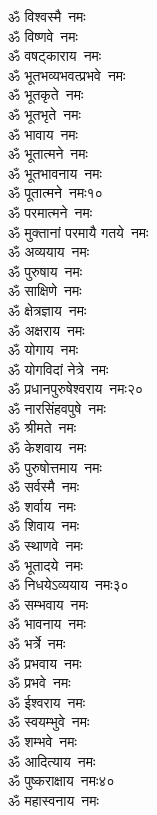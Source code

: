 \begin{multicols}{2}
\begin{flushleft}
ॐ विश्वस्मै~नमः\\
ॐ विष्णवे~नमः\\
ॐ वषट्काराय~नमः\\
ॐ भूतभव्यभवत्प्रभवे~नमः\\
ॐ भूतकृते~नमः\\
ॐ भूतभृते~नमः\\
ॐ भावाय~नमः\\
ॐ भूतात्मने~नमः\\
ॐ भूतभावनाय~नमः\\
ॐ पूतात्मने~नमः\hfill १०\\
ॐ परमात्मने~नमः\\
ॐ मुक्तानां परमायै गतये~नमः\\
ॐ अव्ययाय~नमः\\
ॐ पुरुषाय~नमः\\
ॐ साक्षिणे~नमः\\
ॐ क्षेत्रज्ञाय~नमः\\
ॐ अक्षराय~नमः\\
ॐ योगाय~नमः\\
ॐ योगविदां नेत्रे~नमः\\
ॐ प्रधानपुरुषेश्वराय~नमः\hfill २०\\
ॐ नारसिंहवपुषे~नमः\\
ॐ श्रीमते~नमः\\
ॐ केशवाय~नमः\\
ॐ पुरुषोत्तमाय~नमः\\
ॐ सर्वस्मै~नमः\\
ॐ शर्वाय~नमः\\
ॐ शिवाय~नमः\\
ॐ स्थाणवे~नमः\\
ॐ भूतादये~नमः\\
ॐ निधयेऽव्ययाय~नमः\hfill ३०\\
ॐ सम्भवाय~नमः\\
ॐ भावनाय~नमः\\
ॐ भर्त्रे~नमः\\
ॐ प्रभवाय~नमः\\
ॐ प्रभवे~नमः\\
ॐ ईश्वराय~नमः\\
ॐ स्वयम्भुवे~नमः\\
ॐ शम्भवे~नमः\\
ॐ आदित्याय~नमः\\
ॐ पुष्कराक्षाय~नमः\hfill ४०\\
ॐ महास्वनाय~नमः\\

\end{flushleft}
\end{multicols}
